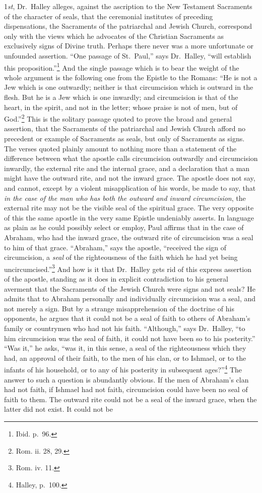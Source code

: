 \documentclass[english,]{book}
\begin{document}
1\emph{st}, Dr.~Halley alleges, against the ascription to the New Testament Sacraments of the character of seals, that the ceremonial institutes of preceding dispensations, the Sacraments of the patriarchal and Jewish Church, correspond only with the views which he advocates of the Christian Sacraments as exclusively signs of Divine truth. Perhaps there never was a more unfortunate or unfounded assertion. ``One passage of St.~Paul,'' says Dr.~Halley, ``will establish this proposition.''\footnote{Ibid. p.~96.} And the single passage which is to bear the weight of the whole argument is the following one from the Epistle to the Romans: ``He is not a Jew which is one outwardly; neither is that circumcision which is outward in the flesh. But he is a Jew which is one inwardly; and circumcision is that of the heart, in the spirit, and not in the letter; whose praise is not of men, but of God.''\footnote{Rom. ii. 28, 29.} This is the solitary passage quoted to prove the broad and general assertion, that the Sacraments of the patriarchal and Jewish Church afford no precedent or example of Sacraments as seals, but only of Sacraments as signs. The verses quoted plainly amount to nothing more than a statement of the difference between what the apostle calls circumcision outwardly and circumcision inwardly, the external rite and the internal grace, and a declaration that a man might have the outward rite, and not the inward grace. The apostle does not say, and cannot, except by a violent misapplication of his words, be made to say, that \emph{in the case of the man who has both the outward and inward circumcision}, the external rite may not be the visible seal of the spiritual grace. The very opposite of this the same apostle in the very same Epistle undeniably asserts. In language as plain as he could possibly select or employ, Paul affirms that in the case of Abraham, who had the inward grace, the outward rite of circumcision was a seal to him of that grace. ``Abraham,'' says the apostle, ``received the sign of circumcision, a \emph{seal} of the righteousness of the faith which he had yet being uncircumcised.''\footnote{Rom. iv. 11.} And how is it that Dr.~Halley gets rid of this express assertion of the apostle, standing as it does in explicit contradiction to his general averment that the Sacraments of the Jewish Church were signs and not seals? He admits that to Abraham personally and individually circumcision was a seal, and not merely a sign. But by a strange misapprehension of the doctrine of his opponents, he argues that it could not be a seal of faith to others of Abraham's family or countrymen who had not his faith. ``Although,'' says Dr.~Halley, ``to him circumcision was the seal of faith, it could not have been so to his posterity.'' ``Was it,'' he asks, ``was it, in this sense, a seal of the righteousness which they had, an approval of their faith, to the men of his clan, or to Ishmael, or to the infants of his household, or to any of his posterity in subsequent ages?''\footnote{Halley, p.~100.} The answer to such a question is abundantly obvious. If the men of Abraham's clan had not faith, if Ishmael had not faith, circumcision could have been no seal of faith to them. The outward rite could not be a seal of the inward grace, when the latter did not exist. It could not be 
\end{document}
